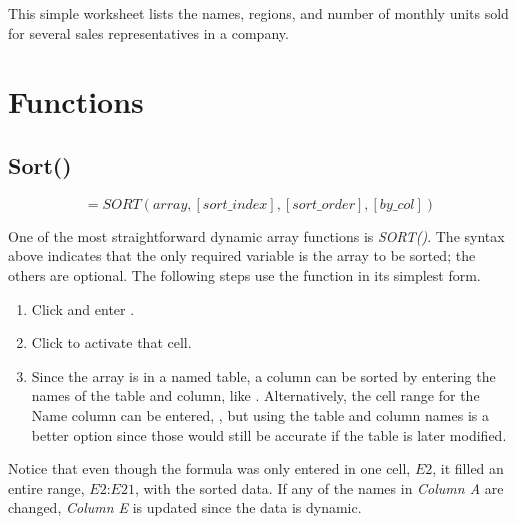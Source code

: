 This simple worksheet lists the names, regions, and number of monthly units sold for several sales representatives in a company. 

\section{Functions}

\subsection{Sort()}

\[ =SORT(array,[sort\_index],[sort\_order],[by\_col]) \]

One of the most straightforward dynamic array functions is \textit{SORT()}. The syntax above indicates that the only required variable is the array to be sorted; the others are optional. The following steps use the function in its simplest form.

\begin{enumbox}
	\begin{enumerate}
		\item Click  and enter .
		\item Click  to activate that cell.
		\item Since the array is in a named table, a column can be sorted by entering the names of the table and column, like . Alternatively, the cell range for the Name column can be entered, , but using the table and column names is a better option since those would still be accurate if the table is later modified.
	\end{enumerate}
\end{enumbox}

Notice that even though the formula was only entered in one cell, $ E2 $, it filled an entire range, $ E2 $:$ E21 $, with the sorted data. If any of the names in \textit{Column A} are changed, \textit{Column E} is updated since the data is dynamic.

